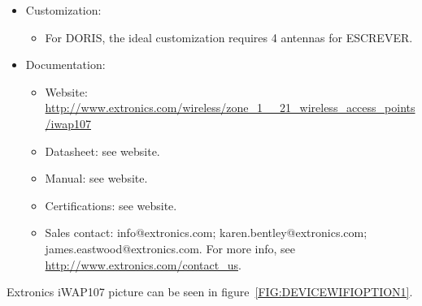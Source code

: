 \begin{itemize}
\begin{itemize}
  \end{itemize}
  \item Customization:
  \begin{itemize}
    \item For DORIS, the ideal customization requires 4 antennas for ESCREVER.
  \end{itemize}
  \item Documentation:
  \begin{itemize}
    \item Website: \href{http://www.extronics.com/wireless/zone\_1\_\_21\_wireless\_access\_points/iwap107}{http://www.extronics.com/wireless/zone\_1\_\_21\_wireless\_access\_points/iwap107}
    \item Datasheet: see website.
    \item Manual: see website.
    \item Certifications: see website.
    \item Sales contact: info@extronics.com; karen.bentley@extronics.com; james.eastwood@extronics.com. For more info, see \href{http://www.extronics.com/contact\_us}{http://www.extronics.com/contact\_us}.
  \end{itemize}
\end{itemize}
Extronics iWAP107 picture can be seen in figure~\ref{FIG:DEVICEWIFIOPTION1}.
